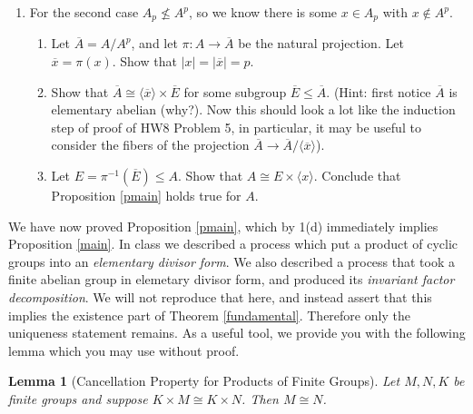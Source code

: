 \documentclass[11pt]{article}
\newtheorem{lemma}{Lemma}
\newcommand{\la}{\langle}
\newcommand{\ra}{\rangle}
\begin{document}
\begin{enumerate}
{\begin{enumerate}
{\begin{enumerate}
{      Let $A_0 = \la y_1,\cdots,y_t\ra$.  Show that $A_0\cong\la y_1\ra\times\la y_2\ra\times\cdots\times\la y_t\ra$.  (It might be useful to use induction on $t$).
      }
      \item{
      Show that $A^p\unlhd A_0$ and that $A_0/A^p$ is an elementary abelian group of order $p^t$.
      }
      \item{
      Use part (c) and (d)(iii) to show that $|A_0| = |A|$.  Conclude that Proposition \ref{pmain} holds for $A$.
      }
    \end{enumerate}
    }
    \item{
    For the second case $A_p\not\le A^p$, so we know there is some $x\in A_p$ with $x\notin A^p$.
    \begin{enumerate}
      \item{
      Let $\overline A = A/A^p$, and let $\pi:A\to \overline A$ be the natural projection.  Let $\overline x = \pi(x)$.  Show that $|x| = |\overline x| = p$.
      }
      \item{
      Show that $\overline A\cong \la\overline x\ra\times\overline E$ for some subgroup $\overline E\le \overline A$.  (Hint: first notice $\overline A$ is elementary abelian (why?).  Now this should look a lot like the induction step of proof of HW8 Problem 5, in particular, it may be useful to consider the fibers of the projection $\overline A\to\overline A/\la\overline x\ra$).
      }
      \item{
      Let $E = \pi^{-1}(\overline E)\le A$.  Show that $A\cong E\times\la x\ra$.  Conclude that Proposition \ref{pmain} holds true for $A$.
      }
    \end{enumerate}
    }
  \end{enumerate}
  }
\end{enumerate}
We have now proved Proposition \ref{pmain}, which by 1(d) immediately implies Proposition \ref{main}.  In class we described a process which put a product of cyclic groups into an \textit{elementary divisor form}.  We also described a process that took a finite abelian group in elemetary divisor form, and produced its \textit{invariant factor decomposition}.  We will not reproduce that here, and instead assert that this implies the existence part of Theorem \ref{fundamental}.  Therefore only the uniqueness statement remains.  As a useful tool, we provide you with the following lemma which you may use without proof.
\begin{lemma}[Cancellation Property for Products of Finite Groups]\label{cancel}
  Let $M,N,K$ be finite groups and suppose $K\times M\cong K\times N$.  Then $M\cong N$.
\end{lemma}
\end{document}

